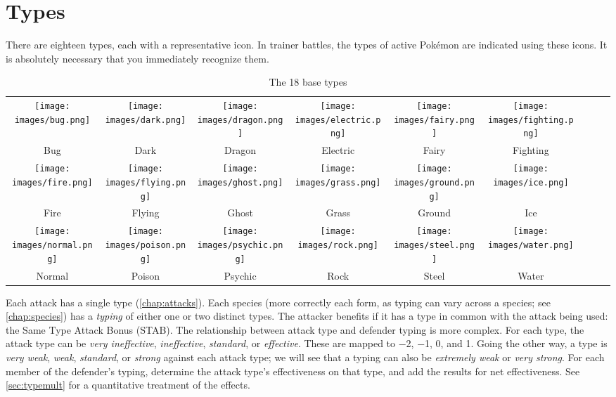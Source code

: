 \chapter{Types\label{chap:types}}
\nopagecolor{}There are eighteen types, each with a representative icon.
In trainer battles, the types of active Pokémon are indicated
 using these icons.
It is absolutely necessary that you immediately recognize them.

\begin{table}[ht!]
\centering
\begin{tabular}{c c c c c c c c c}
\texttt{[image: images/bug.png]} &
\texttt{[image: images/dark.png]} &
\texttt{[image: images/dragon.png]} &
\texttt{[image: images/electric.png]} &
\texttt{[image: images/fairy.png]} &
\texttt{[image: images/fighting.png]} \\
Bug & Dark & Dragon & Electric & Fairy & Fighting \\
\texttt{[image: images/fire.png]} &
\texttt{[image: images/flying.png]} &
\texttt{[image: images/ghost.png]} &
\texttt{[image: images/grass.png]} &
\texttt{[image: images/ground.png]} &
\texttt{[image: images/ice.png]} \\
Fire & Flying & Ghost & Grass & Ground & Ice \\
\texttt{[image: images/normal.png]} &
\texttt{[image: images/poison.png]} &
\texttt{[image: images/psychic.png]} &
\texttt{[image: images/rock.png]} &
\texttt{[image: images/steel.png]} &
\texttt{[image: images/water.png]} \\
Normal & Poison & Psychic & Rock & Steel & Water \\
\end{tabular}
\caption{The 18 base types\label{table:basetypes}}
\end{table}

Each attack has a single type (\autoref{chap:attacks}).
Each species (more correctly each form, as typing can vary across a species; see \autoref{chap:species})
  has a \textit{typing} of either one or two distinct types.
The attacker benefits if it has a type in common with the attack being used:
  the Same Type Attack Bonus (STAB).
The relationship between attack type and defender typing is more complex.
For each type, the attack type can be \textit{very ineffective},
  \textit{ineffective}, \textit{standard}, or \textit{effective}.
These are mapped to −2, −1, 0, and 1.
Going the other way, a type is \textit{very weak}, \textit{weak},
  \textit{standard}, or \textit{strong} against each attack type;
  we will see that a typing can also be \textit{extremely weak} or
  \textit{very strong}.
For each member of the defender's typing, determine the attack type's effectiveness
  on that type, and add the results for net effectiveness.
See \autoref{sec:typemult} for a quantitative treatment of the effects.

